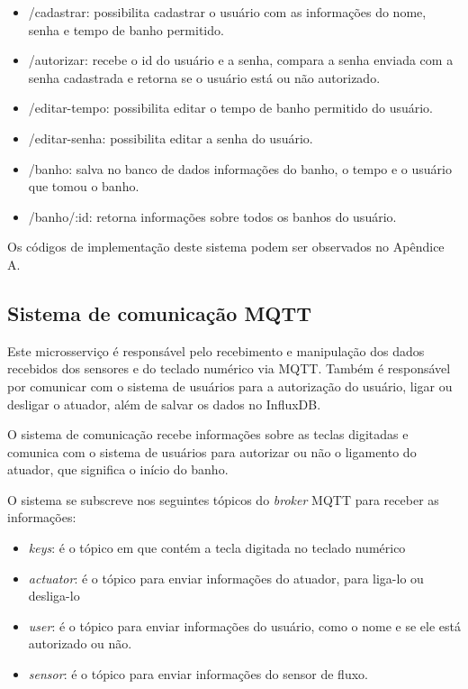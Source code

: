 \begin{itemize}
	\item /cadastrar: possibilita cadastrar o usuário com as informações do nome, senha e tempo de banho permitido.
	\item /autorizar: recebe o id do usuário e a senha, compara a senha enviada com a senha cadastrada e retorna se o usuário está ou não autorizado.
	\item /editar-tempo: possibilita editar o tempo de banho permitido do usuário.
	\item /editar-senha: possibilita editar a senha do usuário.
	\item /banho: salva no banco de dados informações do banho, o tempo e o usuário que tomou o banho.
	\item /banho/:id: retorna informações sobre todos os banhos do usuário.
\end{itemize}

Os códigos de implementação deste sistema podem ser observados no Apêndice A.

\subsection{Sistema de comunicação MQTT}

Este microsserviço é responsável pelo recebimento e manipulação dos dados recebidos dos sensores e do teclado numérico via MQTT. Também é responsável por comunicar com o sistema de usuários para a autorização do usuário, ligar ou desligar o atuador, além de salvar os dados no InfluxDB.

O sistema de comunicação recebe informações sobre as teclas digitadas e comunica com o sistema de usuários para autorizar ou não o ligamento do atuador, que significa o início do banho.

O sistema se subscreve nos seguintes tópicos do \textit{broker} MQTT para receber as informações:

\begin{itemize}
	\item \textit{keys}: é o tópico em que contém a tecla digitada no teclado numérico
	\item \textit{actuator}: é o tópico para enviar informações do atuador, para liga-lo ou desliga-lo
	\item \textit{user}: é o tópico para enviar informações do usuário, como o nome e se ele está autorizado ou não.
	\item \textit{sensor}: é o tópico para enviar informações do sensor de fluxo.
\end{itemize}

